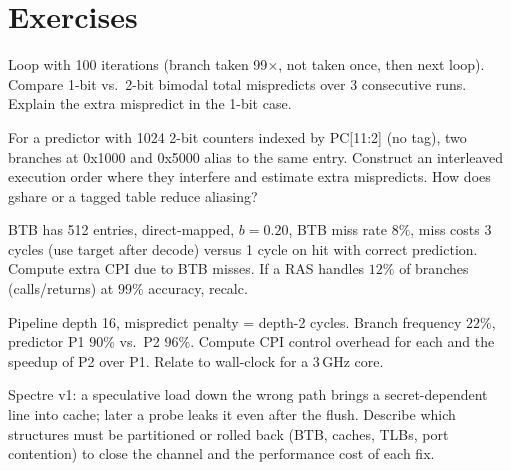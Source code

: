
\section{Exercises}
\begin{exercise}Loop with 100 iterations (branch taken 99$\times$, not taken once, then next loop). Compare 1-bit vs.\ 2-bit bimodal total mispredicts over 3 consecutive runs. Explain the extra mispredict in the 1-bit case.\end{exercise}
\begin{exercise}For a predictor with 1024 2-bit counters indexed by PC[11:2] (no tag), two branches at 0x1000 and 0x5000 alias to the same entry. Construct an interleaved execution order where they interfere and estimate extra mispredicts. How does gshare or a tagged table reduce aliasing?\end{exercise}
\begin{exercise}BTB has 512 entries, direct-mapped, $b=0.20$, BTB miss rate $8\%$, miss costs 3 cycles (use target after decode) versus 1 cycle on hit with correct prediction. Compute extra CPI due to BTB misses. If a RAS handles $12\%$ of branches (calls/returns) at $99\%$ accuracy, recalc.\end{exercise}
\begin{exercise}Pipeline depth 16, mispredict penalty = depth-2 cycles. Branch frequency $22\%$, predictor P1 $90\%$ vs.\ P2 $96\%$. Compute CPI control overhead for each and the speedup of P2 over P1. Relate to wall-clock for a 3\,GHz core.\end{exercise}
\begin{exercise}Spectre v1: a speculative load down the wrong path brings a secret-dependent line into cache; later a probe leaks it even after the flush. Describe which structures must be partitioned or rolled back (BTB, caches, TLBs, port contention) to close the channel and the performance cost of each fix.\end{exercise}

